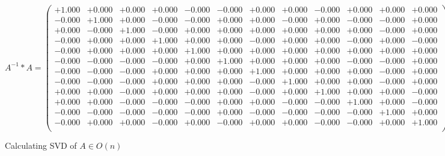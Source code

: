 \documentclass[9pt]{article}
\theoremstyle{plain}
\theoremstyle{definition}
\theoremstyle{remark}
\numberwithin{equation}{section}
\begin{document}
$A^{-1} *A = \left(
\begin{array}{
cccccccccccc}
+1.000 & +0.000 & +0.000 & +0.000 & -0.000 & -0.000 & +0.000 & +0.000 & -0.000 & +0.000 & +0.000 & +0.000 \\
-0.000 & +1.000 & +0.000 & -0.000 & -0.000 & +0.000 & +0.000 & -0.000 & +0.000 & -0.000 & -0.000 & +0.000 \\
+0.000 & -0.000 & +1.000 & -0.000 & +0.000 & +0.000 & +0.000 & +0.000 & +0.000 & +0.000 & -0.000 & +0.000 \\
-0.000 & +0.000 & +0.000 & +1.000 & +0.000 & +0.000 & -0.000 & +0.000 & +0.000 & -0.000 & +0.000 & -0.000 \\
-0.000 & +0.000 & +0.000 & +0.000 & +1.000 & +0.000 & +0.000 & +0.000 & +0.000 & +0.000 & +0.000 & +0.000 \\
-0.000 & -0.000 & -0.000 & -0.000 & +0.000 & +1.000 & +0.000 & +0.000 & +0.000 & -0.000 & -0.000 & +0.000 \\
-0.000 & -0.000 & -0.000 & +0.000 & +0.000 & +0.000 & +1.000 & +0.000 & +0.000 & +0.000 & -0.000 & +0.000 \\
-0.000 & -0.000 & -0.000 & +0.000 & +0.000 & +0.000 & -0.000 & +1.000 & +0.000 & +0.000 & -0.000 & +0.000 \\
+0.000 & +0.000 & -0.000 & +0.000 & +0.000 & +0.000 & -0.000 & +0.000 & +1.000 & +0.000 & +0.000 & -0.000 \\
+0.000 & +0.000 & -0.000 & -0.000 & -0.000 & +0.000 & +0.000 & -0.000 & -0.000 & +1.000 & +0.000 & -0.000 \\
-0.000 & -0.000 & -0.000 & -0.000 & -0.000 & +0.000 & -0.000 & -0.000 & -0.000 & -0.000 & +1.000 & +0.000 \\
-0.000 & +0.000 & +0.000 & -0.000 & +0.000 & -0.000 & +0.000 & +0.000 & -0.000 & -0.000 & +0.000 & +1.000 \\
\end{array}
\right)$ \newline 

Calculating SVD of  $A \in O(n)$
\end{document}
